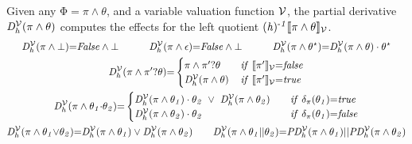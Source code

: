 \documentclass[acmsmall,10pt,review]{acmart}
\newcommand{\env}{\code{\mathcal{V}}}
\newcommand{\es}{\theta}
\newcommand{\timedEffects}{\emph{TimEffs}}
\newcommand{\effect}{{\ensuremath{\mathrm{\Phi}}}}
\newcommand{\choice}{\vee}
\newcommand{\code}[1]{{\tt{\ensuremath{\m{#1}}}}}
\newcommand{\empt}{\textcolor{black}{\ensuremath{\epsilon}}}
\newcommand{\bott}{\textcolor{black}{\ensuremath{\bot}}}
\newcommand{\m}{\mathit}
\begin{document}
{\begin{definition}[Partial Derivative\footnote{Intuitively, the partial derivative refers to the left quotient of a language equation, for example, for REs, \code{x^{{-}1} \llbracket x\cdot y\rrbracket {=} y};  \code{y^{{-}1} \llbracket x\cdot y\rrbracket {=} \bott}; and  \code{y^{{-}1} \llbracket x + y\rrbracket {=} \epsilon}. Here we come up with a new notion of partial derivative for \timedEffects. 
}]\label{Derivative}
Given any \code{\effect {=} \pi \wedge \es}, and a variable valuation function \code{\env}, 
the partial derivative \code{D^{\env}_{h}(\pi \wedge \es)} 
 computes the  effects for the 
left quotient \code{(h)^{\text{-}1}\llbracket \pi \wedge \es 
\rrbracket_{\env}}. 
\begin{gather*}
\code{D^{\env}_{h}(\pi \wedge \bott) {=}}  \code{False \wedge \bott} 
\qquad\ \ \  
\code{D^{\env}_{h}( \pi \wedge \empt) {=}}  \code{False \wedge \bott} 
\qquad\ \ \ 
\code{D^{\env}_{h}( \pi \wedge {\es^\star}) } {=} \code{ D^{\env}_{h}(\pi \wedge  {\es}) \cdot {\es^\star}}  
\\
{
 \code{\code{D^{\env}_{h}(\pi \wedge \pi^\prime? \es)} {=}}
\begin{cases}
      \code{\pi \wedge \pi^\prime? \es} \quad &\code{if\ \llbracket \pi^\prime  \rrbracket_{\env} {=} false}   \\
      \code{D^{\env}_{h}(\pi \wedge \es)} & \code{if\ \llbracket \pi^\prime  \rrbracket_{\env} {=} true} 
    \end{cases} 
    }
    \\ 
{
 \code{D^{\env}_{h}(\pi \wedge \es_1 {\cdot} \es_2) {=} }
\begin{cases}
      \code{D^{\env}_{h}(\pi \wedge \es_1) \cdot  \es_2\ \vee \  D^{\env}_{h}(\pi \wedge \es_2)} \quad &\code{if\ \delta_{\pi}(\es_1) {=} true}   \\
      \code{D^{\env}_{h}(\pi \wedge \es_2) \cdot  \es_2} & \code{if\ \delta_{\pi}(\es_1) {=} false} 
    \end{cases} 
    }
\\
\code{D^{\env}_{h}(\pi \wedge  \es_1 {\choice} \es_2) } {=} \code{ D^{\env}_{h}(\pi \wedge  \es_1) \choice D^{\env}_{h}( \pi \wedge \es_2)} 
\qquad 
\code{D^{\env}_{h}(\pi \wedge \es_1 {||}\es_2)} {=} \code{PD^{\env}_{h}(\pi \wedge \es_1)} || \code{PD^{\env}_{h}(\pi \wedge \es_2)} 
 \\~\\

\end{gather*}
\end{definition}}
\end{document}
